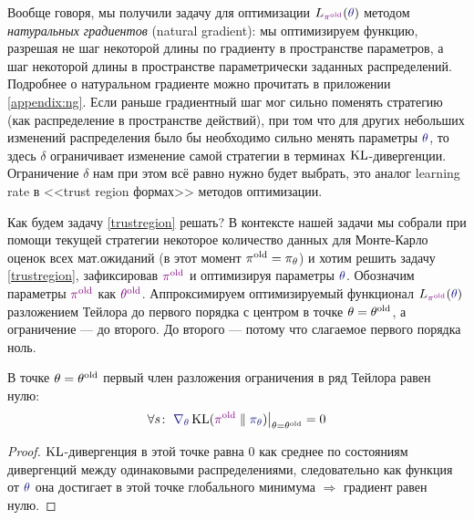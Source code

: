 Вообще говоря, мы получили задачу для оптимизации $L_{\textcolor{ChadPurple}{\pi^{\old}}}(\textcolor{ChadBlue}{\theta})$ методом \emph{натуральных градиентов} (natural gradient): мы оптимизируем функцию, разрешая не шаг некоторой длины по градиенту в пространстве параметров, а шаг некоторой длины в пространстве параметрически заданных распределений. Подробнее о натуральном градиенте можно прочитать в приложении \ref{appendix:ng}. Если раньше градиентный шаг мог сильно поменять стратегию (как распределение в пространстве действий), при том что для других небольших изменений распределения было бы необходимо сильно менять параметры $\textcolor{ChadBlue}{\theta}$, то здесь $\delta$ ограничивает изменение самой стратегии в терминах $\operatorname{KL}$-дивергенции. Ограничение $\delta$ нам при этом всё равно нужно будет выбрать, это аналог learning rate в <<trust region формах>> методов оптимизации.

Как будем задачу \eqref{trustregion} решать? В контексте нашей задачи мы собрали при помощи текущей стратегии некоторое количество данных для Монте-Карло оценок всех мат.ожиданий (в этот момент $\pi^{\old} \HM= \pi_\theta$) и хотим решить задачу \eqref{trustregion}, зафиксировав $\textcolor{ChadPurple}{\pi^{\old}}$ и оптимизируя параметры $\textcolor{ChadBlue}{\theta}$. Обозначим параметры $\textcolor{ChadPurple}{\pi^{\old}}$ как $\textcolor{ChadPurple}{\theta^{\old}}$. Аппроксимируем оптимизируемый функционал $L_{\textcolor{ChadPurple}{\pi^{\old}}}(\textcolor{ChadBlue}{\theta})$ разложением Тейлора до первого порядка с центром в точке $\theta = \theta^{\mathrm{old}}$, а ограничение --- до второго. До второго --- потому что слагаемое первого порядка ноль.

\begin{proposition}
В точке $\theta = \theta^{\mathrm{old}}$ первый член разложения ограничения в ряд Тейлора равен нулю:
\begin{equation*}
\forall s \colon \left. \textcolor{ChadBlue}{\nabla_\theta} \KL(\textcolor{ChadPurple}{\pi^{\old}} \parallel \textcolor{ChadBlue}{\pi_\theta}) \right|_{\theta = \theta^{\old}} = 0
\end{equation*}
\begin{proof}
$\operatorname{KL}$-дивергенция в этой точке равна 0 как среднее по состояниям дивергенций между одинаковыми распределениями, следовательно как функция от $\textcolor{ChadBlue}{\theta}$ она достигает в этой точке глобального минимума $\Rightarrow$ градиент равен нулю.
\end{proof}
\end{proposition}

